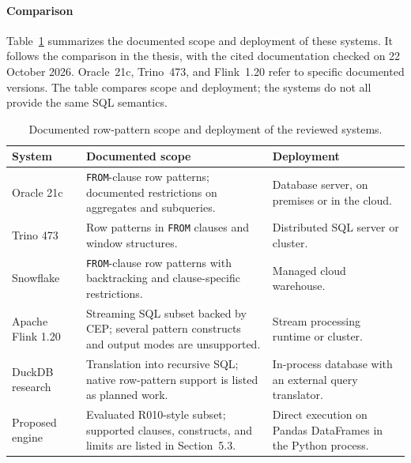 \documentclass[preprint,12pt,times,a4paper]{elsarticle}
\begin{document}
\paragraph{Comparison}
Table~\ref{tab:engine_comparison} summarizes the documented scope and
deployment of these systems. It follows the comparison in the thesis, with
the cited documentation checked on 22 October 2026. Oracle~21c, Trino~473,
and Flink~1.20 refer to specific documented versions. The table compares scope
and deployment; the systems do not all provide the same SQL semantics.

\begin{table}[htbp]
\centering\footnotesize

\setlength{\tabcolsep}{4pt}
\begin{tabularx}{\textwidth}{@{}>{\raggedright\arraybackslash}p{}
  >{\raggedright\arraybackslash}X>{\raggedright\arraybackslash}p{}@{}}
\toprule
\textbf{System} & \textbf{Documented scope} & \textbf{Deployment} \\
\midrule
Oracle 21c~\cite{oracle2022} & \texttt{FROM}-clause row patterns;
documented restrictions on aggregates and subqueries. & Database server,
on premises or in the cloud. \\
Trino 473~\cite{trino2022,TrinoDocumentation} & Row patterns in
\texttt{FROM} clauses and window structures. & Distributed SQL server
or cluster. \\
Snowflake~\cite{snowflake2025match_recognize} & \texttt{FROM}-clause row
patterns with backtracking and clause-specific restrictions. & Managed
cloud warehouse. \\
Apache Flink 1.20~\cite{flink} & Streaming SQL subset backed by CEP;
several pattern constructs and output modes are unsupported. & Stream
processing runtime or cluster. \\
DuckDB research~\cite{lambrecht2025democratize,duckdb2026roadmap} &
Translation into recursive SQL; native row-pattern support is listed as
planned work. & In-process database with an external query translator. \\
\midrule
Proposed engine & Evaluated R010-style subset; supported clauses,
constructs, and limits are listed in Section~5.3. & Direct execution on
Pandas DataFrames in the Python process. \\
\bottomrule
\end{tabularx}
\caption{Documented row-pattern scope and deployment of the reviewed systems.}
\label{tab:engine_comparison}
\end{table}
\end{document}
